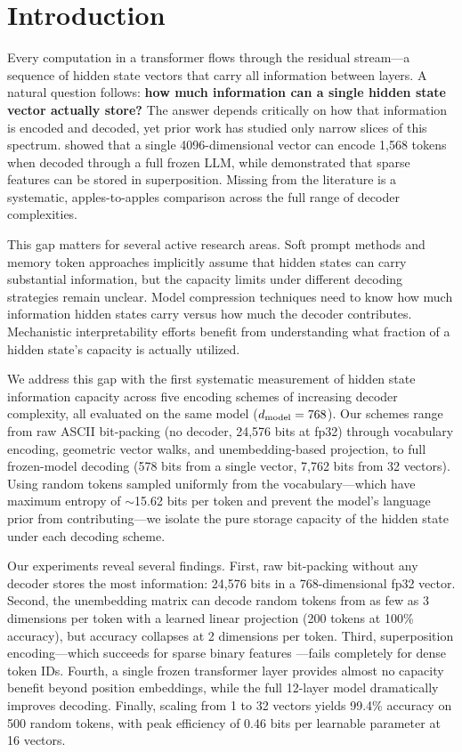 \section{Introduction}
\label{sec:intro}

Every computation in a transformer flows through the residual stream---a sequence of hidden state vectors that carry all information between layers. A natural question follows: {\bf how much information can a single hidden state vector actually store?} The answer depends critically on how that information is encoded and decoded, yet prior work has studied only narrow slices of this spectrum. \citet{kuratov2025cramming} showed that a single 4096-dimensional vector can encode 1,568 tokens when decoded through a full frozen LLM, while \citet{elhage2022superposition} demonstrated that sparse features can be stored in superposition. Missing from the literature is a systematic, apples-to-apples comparison across the full range of decoder complexities.

This gap matters for several active research areas. Soft prompt methods \citep{belrose2023tuned,pal2023future} and memory token approaches implicitly assume that hidden states can carry substantial information, but the capacity limits under different decoding strategies remain unclear. Model compression techniques need to know how much information hidden states carry versus how much the decoder contributes. Mechanistic interpretability efforts \citep{geva2021transformer,dar2023analyzing} benefit from understanding what fraction of a hidden state's capacity is actually utilized.

We address this gap with the first systematic measurement of hidden state information capacity across five encoding schemes of increasing decoder complexity, all evaluated on the same \gptwo model ($d_{\mathrm{model}} = 768$). Our schemes range from raw ASCII bit-packing (no decoder, 24,576 bits at fp32) through vocabulary encoding, geometric vector walks, and unembedding-based projection, to full frozen-model decoding (578 bits from a single vector, 7,762 bits from 32 vectors). Using random tokens sampled uniformly from the vocabulary---which have maximum entropy of $\sim$15.62 bits per token and prevent the model's language prior from contributing---we isolate the pure storage capacity of the hidden state under each decoding scheme.

Our experiments reveal several findings. First, raw bit-packing without any decoder stores the most information: 24,576 bits in a 768-dimensional fp32 vector. Second, the unembedding matrix can decode random tokens from as few as 3 dimensions per token with a learned linear projection (200 tokens at 100\% accuracy), but accuracy collapses at 2 dimensions per token. Third, superposition encoding---which succeeds for sparse binary features \citep{elhage2022superposition}---fails completely for dense token IDs. Fourth, a single frozen transformer layer provides almost no capacity benefit beyond position embeddings, while the full 12-layer model dramatically improves decoding. Finally, scaling from 1 to 32 \memvec vectors yields 99.4\% accuracy on 500 random tokens, with peak efficiency of 0.46 bits per learnable parameter at 16 vectors.

